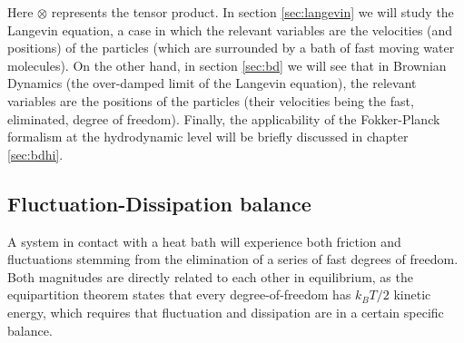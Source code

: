 \documentclass[twoside,openright,titlepage,numbers=noenddot,%
headinclude,footinclude,cleardoublepage=empty,abstract=on,
BCOR=5mm,fontsize=11pt, dvipsnames, paper=b5
]{scrreprt}
\newcommand{\kT}{k_B T}
\begin{document}
Here $\otimes$ represents the tensor product.
In section \ref{sec:langevin} we will study the Langevin equation, a case in which the relevant variables are the velocities (and positions) of the particles (which are surrounded by a bath of fast moving water molecules). On the other hand, in section \ref{sec:bd} we will see that in Brownian Dynamics (the over-damped limit of the Langevin equation), the relevant variables are the positions of the particles (their velocities being the fast, eliminated, degree of freedom). Finally, the applicability of the Fokker-Planck formalism at the hydrodynamic level will be briefly discussed in chapter \ref{sec:bdhi}.

\subsection{Fluctuation-Dissipation balance}\label{sec:fdb}
A system in contact with a heat bath will experience both friction and fluctuations stemming from the elimination of a series of fast degrees of freedom. Both magnitudes are directly related to each other in equilibrium, as the equipartition theorem states that every degree-of-freedom has $\kT/2$ kinetic energy, which requires that fluctuation and dissipation are in a certain specific balance.
\end{document}
